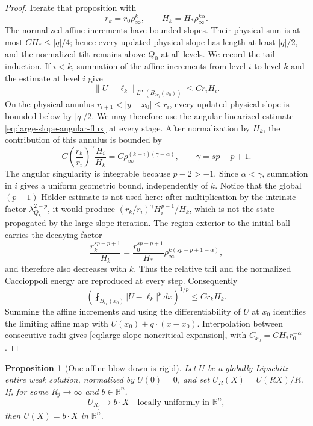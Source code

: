 \documentclass[11pt,reqno]{amsart}
\numberwithin{equation}{section}
\newcommand{\R}{\mathbb R}
\newcommand{\dd}{\,d}
\newtheorem{proposition}[theorem]{Proposition}
\theoremstyle{remark}
\begin{document}
\begin{proof}
Iterate that proposition with
\[
 r_k=r_0\rho_\infty^k,\qquad
 H_k=H_*\rho_\infty^{k\alpha}.
\]
The normalized affine increments have bounded slopes.  Their physical
sum is at most \(CH_*\le |q|/4\); hence every updated physical slope has
length at least \(|q|/2\), and the normalized tilt remains above \(Q_0\)
at all levels.  We record the tail induction.  If \(i<k\), summation of
the affine increments from level \(i\) to level \(k\) and the estimate at
level \(i\) give
\begin{equation}
 \|U-\ell_k\|_{L^\infty(B_{2r_i}(x_0))}
 \le Cr_iH_i.
 \label{eq:noncritical-old-annulus-control}
\end{equation}
On the physical annulus \(r_{i+1}<|y-x_0|\le r_i\), every updated
physical slope is bounded below by \(|q|/2\).  We may therefore use the
angular linearized estimate \eqref{eq:large-slope-angular-flux} at every
stage.  After normalization by \(H_k\), the contribution of this
annulus is bounded by
\[
 C\left(\frac{r_k}{r_i}\right)^\gamma\frac{H_i}{H_k}
 =C\rho_\infty^{(k-i)(\gamma-\alpha)},
 \qquad \gamma=sp-p+1.
\]
The angular singularity is integrable because \(p-2>-1\).  Since
\(\alpha<\gamma\), summation in \(i\) gives a uniform geometric bound,
independently of \(k\).  Notice that the global
\((p-1)\)-H\"older estimate is not used here: after multiplication by
the intrinsic factor \(\lambda_{Q_k}^{2-p}\), it would produce
\((r_k/r_i)^\gamma H_i^{p-1}/H_k\), which is not the state propagated
by the large-slope iteration.  The region exterior to the initial ball
carries the decaying factor
\[
 \frac{r_k^{sp-p+1}}{H_k}
 =\frac{r_0^{sp-p+1}}{H_*}
   \rho_\infty^{k(sp-p+1-\alpha)},
\]
and therefore also decreases with \(k\).  Thus the relative tail and the normalized Caccioppoli
energy are reproduced at every step.  Consequently
\[
 \left(\fint_{B_{r_k}(x_0)}
 |U-\ell_k|^p\dd x\right)^{1/p}
 \le Cr_kH_k.
\]
Summing the affine increments and using the differentiability of \(U\)
at \(x_0\) identifies the limiting affine map with
\(U(x_0)+q\cdot(x-x_0)\).  Interpolation between consecutive radii gives
\eqref{eq:large-slope-noncritical-expansion}, with
\(C_{x_0}=CH_*r_0^{-\alpha}\).
\end{proof}

\begin{proposition}[One affine blow-down is rigid]
\label{prop:affine-blowdown-rigidity}
Let \(U\) be a globally Lipschitz entire weak solution, normalized by
\(U(0)=0\), and set \(U_R(X)=U(RX)/R\).  If, for some \(R_j\to\infty\)
and \(b\in\R^n\),
\begin{equation}
 U_{R_j}\longrightarrow b\cdot X
 \quad\text{locally uniformly in }\R^n,
 \label{eq:affine-blowdown-convergence}
\end{equation}
then \(U(X)=b\cdot X\) in \(\R^n\).
\end{proposition}
\end{document}
